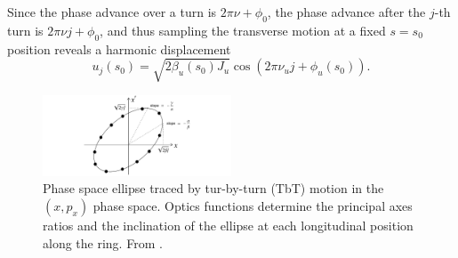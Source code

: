  Since the phase advance over a turn is $2\pi \nu+\phi_0$, the phase advance after the $j$-th turn is $2\pi\nu j+\phi_0$, and thus
 sampling the transverse motion at a fixed $s=s_0$ position reveals a harmonic displacement
\begin{equation}
    u_j(s_0)=\sqrt{2\beta_u(s_0) J_u}\cos(2\pi\nu_u j+\phi_u(s_0)).
    \label{eq:TbT_motion}
\end{equation}
\begin{figure}[htb]
    \centering
    \includegraphics[width=0.5\textwidth]{Images/ellipse}
    \caption{Phase space ellipse traced by tur-by-turn (TbT) motion in the $(x,p_x)$ phase space. Optics functions determine the principal axes ratios and the inclination of the ellipse at each longitudinal position along the ring. From \cite{wolski2014beam}.}
    \label{ellipse}
\end{figure}
